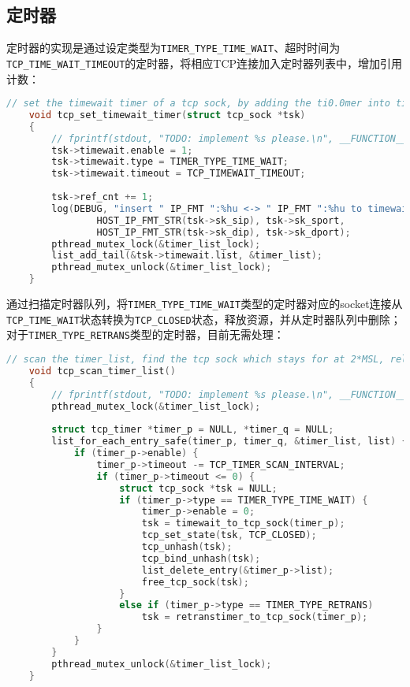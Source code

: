 \documentclass[UTF8]{report}
\begin{document}
\subsection{定时器}

定时器的实现是通过设定类型为\texttt{TIMER_TYPE_TIME_WAIT}、超时时间为\texttt{TCP_TIME_WAIT_TIMEOUT}的定时器，将相应TCP连接加入定时器列表中，增加引用计数：

\begin{lstlisting}[language=C]
    // set the timewait timer of a tcp sock, by adding the ti0.0mer into timer_list
    void tcp_set_timewait_timer(struct tcp_sock *tsk)
    {
        // fprintf(stdout, "TODO: implement %s please.\n", __FUNCTION__);
        tsk->timewait.enable = 1;
        tsk->timewait.type = TIMER_TYPE_TIME_WAIT;
        tsk->timewait.timeout = TCP_TIMEWAIT_TIMEOUT;
    
        tsk->ref_cnt += 1;
        log(DEBUG, "insert " IP_FMT ":%hu <-> " IP_FMT ":%hu to timewait, ref_cnt += 1", 
                HOST_IP_FMT_STR(tsk->sk_sip), tsk->sk_sport,
                HOST_IP_FMT_STR(tsk->sk_dip), tsk->sk_dport);
        pthread_mutex_lock(&timer_list_lock);
        list_add_tail(&tsk->timewait.list, &timer_list);
        pthread_mutex_unlock(&timer_list_lock);
    }
\end{lstlisting}

通过扫描定时器队列，将\texttt{TIMER_TYPE_TIME_WAIT}类型的定时器对应的socket连接从\texttt{TCP_TIME_WAIT}状态转换为\texttt{TCP_CLOSED}状态，释放资源，并从定时器队列中删除；对于\texttt{TIMER_TYPE_RETRANS}类型的定时器，目前无需处理：

\begin{lstlisting}[language=C]
    // scan the timer_list, find the tcp sock which stays for at 2*MSL, release it
    void tcp_scan_timer_list()
    {
        // fprintf(stdout, "TODO: implement %s please.\n", __FUNCTION__);
        pthread_mutex_lock(&timer_list_lock);
    
        struct tcp_timer *timer_p = NULL, *timer_q = NULL;
        list_for_each_entry_safe(timer_p, timer_q, &timer_list, list) {
            if (timer_p->enable) {
                timer_p->timeout -= TCP_TIMER_SCAN_INTERVAL;
                if (timer_p->timeout <= 0) {
                    struct tcp_sock *tsk = NULL;
                    if (timer_p->type == TIMER_TYPE_TIME_WAIT) {
                        timer_p->enable = 0;
                        tsk = timewait_to_tcp_sock(timer_p);
                        tcp_set_state(tsk, TCP_CLOSED);
                        tcp_unhash(tsk);
                        tcp_bind_unhash(tsk);
                        list_delete_entry(&timer_p->list);
                        free_tcp_sock(tsk);
                    }
                    else if (timer_p->type == TIMER_TYPE_RETRANS)
                        tsk = retranstimer_to_tcp_sock(timer_p);
                }
            }
        }
        pthread_mutex_unlock(&timer_list_lock);
    }
\end{lstlisting}
\end{document}
